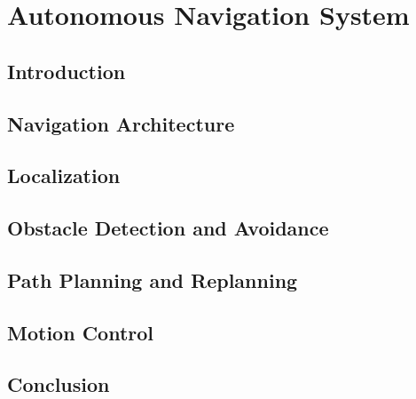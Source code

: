 \chapter{Autonomous Navigation System }

\section{Introduction}

\section{Navigation Architecture}

\section{Localization }

\section{Obstacle Detection and Avoidance}

\section{Path Planning and Replanning }

\section{Motion Control}

\section{Conclusion}
